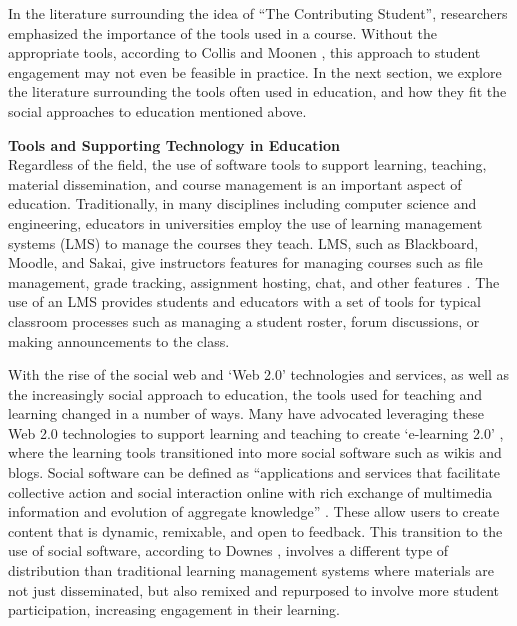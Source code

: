 \begin{itemize}
In the literature surrounding the idea of ``The Contributing Student'', researchers emphasized the importance of the tools used in a course. Without the appropriate tools, according to Collis and Moonen \cite{collis2006contributing}, this approach to student engagement may not even be feasible in practice. In the next section, we explore the literature surrounding the tools often used in education, and how they fit the social approaches to education mentioned above.

\textbf{Tools and Supporting Technology in Education} \\
Regardless of the field, the use of software tools to support learning, teaching, material dissemination, and course management is an important aspect of education. Traditionally, in many disciplines including computer science and engineering, educators in universities employ the use of learning management systems (LMS) to manage the courses they teach. LMS, such as Blackboard, Moodle, and Sakai, give instructors features for managing courses such as file management, grade tracking, assignment hosting, chat, and other features \cite{kumar2011comparative}. The use of an LMS provides students and educators with a set of tools for typical classroom processes such as managing a student roster, forum discussions, or making announcements to the class.

With the rise of the social web and ‘Web 2.0’ technologies and services, as well as the increasingly social approach to education, the tools used for teaching and learning changed in a number of ways. Many have advocated leveraging these Web 2.0 technologies to support learning and teaching to create ‘e-learning 2.0’ \cite{downes2005feature}, where the learning tools transitioned into more social software such as wikis and blogs. Social software can be defined as ``applications and services that facilitate collective action and social interaction online with rich exchange of multimedia information and evolution of aggregate knowledge'' \cite{parameswaran2007social}. These allow users to create content that is dynamic, remixable, and open to feedback. This transition to the use of social software, according to Downes \cite{downes2005feature}, involves a different type of distribution than traditional learning management systems where materials are not just disseminated, but also remixed and repurposed to involve more student participation, increasing engagement in their learning.


\end{itemize}
